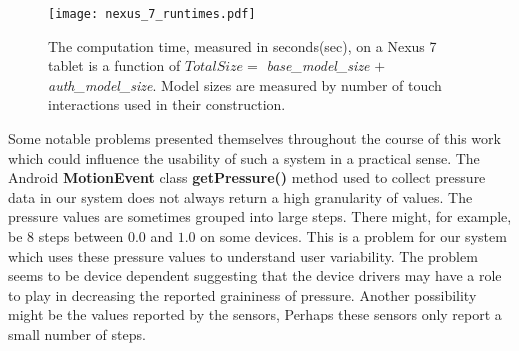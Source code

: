 \begin{figure}
\centering
\texttt{[image: nexus\_7\_runtimes.pdf]}
\caption{
The computation time, measured in seconds(sec), on a Nexus 7 tablet is
a function of
$Total Size =$ {\it base\_model\_size} $+$ {\it auth\_model\_size}.
Model sizes are measured by number of touch interactions used in their construction.
}
\label{fig:nexus_total_size_time}
\end{figure}

\lipsum[0-70]

Some notable problems presented themselves
throughout the course of this work
which could influence the usability of such a 
system in a practical sense.
%
The Android \textbf{MotionEvent} class \textbf{getPressure()} method
used to collect pressure data in our system
does not always return a high granularity of values.
The pressure values are sometimes grouped
into large steps.
There might, for example,
be $8$ steps between $0.0$ and $1.0$ on some devices.
This is a problem for our system which uses
these pressure values to understand user variability.
%
The problem seems to be device dependent
suggesting that the device drivers may have a role to play
in decreasing the reported graininess of pressure.
Another possibility might be the values
reported by the sensors,
Perhaps these sensors only report a small number of steps.

